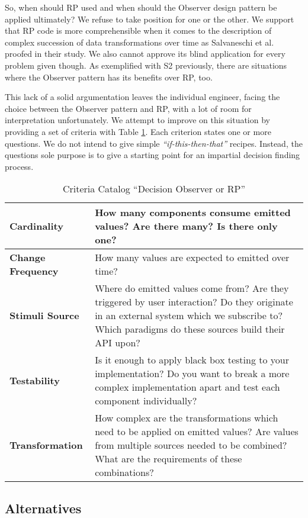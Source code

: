 \documentclass[12pt,a4paper]{article}
\begin{document}
So, when should RP used and when should the Observer design pattern be applied ultimately? We refuse to take position for one or the other. We support that RP code is more comprehensible when it comes to the description of complex succession of data transformations over time as Salvaneschi et al. \cite{7827078} proofed in their study. We also cannot approve its blind application for every problem given though. As exemplified with S2 previously, there are situations where the Observer pattern has its benefits over RP, too.

This lack of a solid argumentation leaves the individual engineer, facing the choice between the Observer pattern and RP, with a lot of room for interpretation unfortunately. We attempt to improve on this situation by providing a set of criteria with Table \ref{tab:criteria}. Each criterion states one or more questions. We do not intend to give simple \emph{``if-this-then-that''} recipes. Instead, the questions sole purpose is to give a starting point for an impartial decision finding process.

\begin{table}[ht]
	\begin{tabularx}{\textwidth}{ |l|X| }
		\hline
		\textbf{Cardinality}      & How many components consume emitted values? Are there many? Is there only one? \\ \hline
		\textbf{Change Frequency} & How many values are expected to emitted over time?\\ \hline
		\textbf{Stimuli Source}   & Where do emitted values come from? Are they triggered by user interaction? Do they originate in an external system which we subscribe to? Which paradigms do these sources build their API upon? \\ \hline
		\textbf{Testability}      & Is it enough to apply black box testing to your implementation? Do you want to break a more complex implementation apart and test each component individually? \\ \hline
		\textbf{Transformation}   & How complex are the transformations which need to be applied on emitted values? Are values from multiple sources needed to be combined? What are the requirements of these combinations?\\ \hline
	\end{tabularx}
	\caption{Criteria Catalog ``Decision Observer or RP''}
	\label{tab:criteria}
\end{table}


\subsection{Alternatives}
\end{document}
